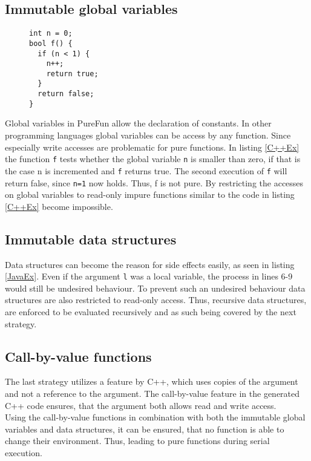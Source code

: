 \subsection{Immutable global variables}
\begin{figure}[h]
\begin{lstlisting}[caption={C++ code that uses a global variable.},label={C++Ex}]
int n = 0;
bool f() {
  if (n < 1) {
    n++;
    return true;
  }
  return false;
}
\end{lstlisting}
\end{figure}
Global variables in PureFun allow the declaration of constants. In other programming languages global variables can be access by any function. Since especially write accesses are problematic for pure functions. In listing \ref{C++Ex} the function \texttt{f} tests whether the global variable \texttt{n} is smaller than zero, if that is the case n is incremented and \texttt{f} returns true. The second execution of \texttt{f} will return false, since \texttt{n=1} now holds. Thus, f is not pure. By restricting the accesses on global variables to read-only impure functions similar to the code in listing \ref{C++Ex} become impossible.
\subsection{Immutable data structures}
Data structures can become the reason for side effects easily, as seen in listing \ref{JavaEx}. Even if the argument \texttt{l} was a local variable, the process in lines 6-9 would still be undesired behaviour. To prevent such an undesired behaviour data structures are also restricted to read-only access. Thus, recursive data structures, are enforced to be evaluated recursively and as such being covered by the next strategy.
\subsection{Call-by-value functions}
The last strategy utilizes a feature by C++, which uses copies of the argument and not a reference to the argument. The call-by-value feature in the generated C++ code ensures, that the argument both allows read and write access.\\
Using the call-by-value functions in combination with both the immutable global variables and data structures, it can be ensured, that no function is able to change their environment. Thus, leading to pure functions during serial execution.
